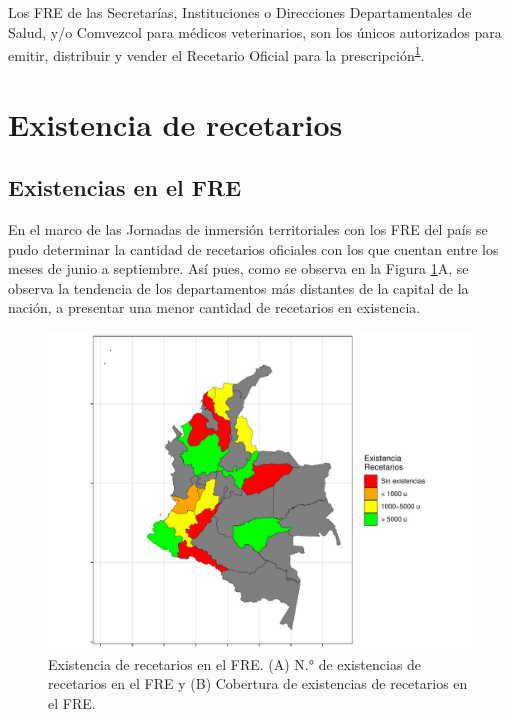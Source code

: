 \documentclass[
]{book}
\begin{document}
Los FRE de las Secretarías, Instituciones o Direcciones Departamentales de Salud, y/o Comvezcol para médicos veterinarios, son los únicos autorizados para emitir, distribuir y vender el Recetario Oficial para la prescripción\textsuperscript{\protect\hyperlink{ref-MSPS1478-2006}{1}}.

\hypertarget{existencia-de-recetarios}{%
\section{Existencia de recetarios}\label{existencia-de-recetarios}}

\hypertarget{existencias-en-el-fre}{%
\subsection{Existencias en el FRE}\label{existencias-en-el-fre}}

En el marco de las Jornadas de inmersión territoriales con los FRE del país se pudo determinar la cantidad de recetarios oficiales con los que cuentan entre los meses de junio a septiembre. Así pues, como se observa en la Figura \ref{fig:existenciasRecetarios}A, se observa la tendencia de los departamentos más distantes de la capital de la nación, a presentar una menor cantidad de recetarios en existencia.

\begin{figure}

{\centering \includegraphics[width=1\linewidth]{InformeFinal_files/figure-latex/existenciasRecetarios-1} 

}

\caption{Existencia de recetarios en el FRE. (A) N.° de existencias de recetarios en el FRE y (B) Cobertura de existencias de recetarios en el FRE.}\label{fig:existenciasRecetarios}
\end{figure}
\end{document}
